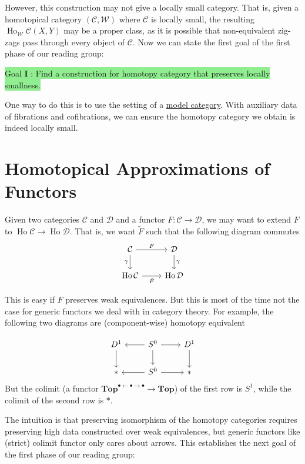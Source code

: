 \documentclass[11pt]{article}
\theoremstyle{definition}
\theoremstyle{remark}
\newcommand{\Ho}{\operatorname{Ho}}
\newcommand{\Top}{\mathbf{Top}}
\newcommand{\calC}{\mathcal{C}}
\newcommand{\calD}{\mathcal{D}}
\begin{document}
However, this construction may not give a locally small category.
That is, given a homotopical category $(\mathcal{C} , \mathcal{W})$ where $\mathcal{C}$ is locally small,
the resulting $\Ho_{\mathcal{W}}\mathcal{C}(X,Y)$ may be a proper class, as it is possible that non-equivalent zig-zags pass through every object of $\mathcal{C}$. Now we can state the first goal of the first phase of our reading group:
\bigbreak

\colorbox{lightgreen}{Goal $\mathbf{I}$ : Find a construction for homotopy category that preserves locally smallness.}

\bigbreak

One way to do this is to use the setting of a
\href{https://ncatlab.org/nlab/show/model+category}{model category}.
With auxiliary data of fibrations and cofibrations,
we can ensure the homotopy category we obtain is indeed locally small. 

\section{Homotopical Approximations of Functors}
Given two categories $\calC$ and $\calD$ and a functor $F : \calC \to \calD$,
we may want to extend $F$ to $\Ho\calC \to \Ho\calD$.
That is, we want $\tilde F$ such that the following diagram commutes
\[\begin{tikzcd}
\calC \arrow[r,"F"] \arrow[d,"\gamma"'] & \calD \arrow[d,"\gamma"] \\
\Ho \calC \arrow[r,"\tilde{F}"'] & \Ho \calD
\end{tikzcd}\]

This is easy if $F$ preserves weak equivalences.
But this is most of the time not the case for generic functors we deal with in category theory.
For example, the following two diagrams are (component-wise) homotopy equivalent

\[
\begin{tikzcd}
    D ^ 1 \arrow[d] & S ^ 0 \arrow[l] \arrow[r] \arrow[d] & D ^1 \arrow[d] \\
    * & S ^ 0 \arrow[l] \arrow[r] & *
\end{tikzcd}
\]
But the colimit (a functor $\Top^{\bullet \leftarrow \bullet \rightarrow \bullet} \to \Top$) of the first row
is $S^1$, while the colimit of the second row is $*$. 

The intuition is that preserving isomorphism of the homotopy categories requires preserving high data
constructed over weak equivalences, but generic functors like (strict) colimit functor only cares about arrows. 
This establishes the next goal of the first phase of our reading group:
\end{document}
